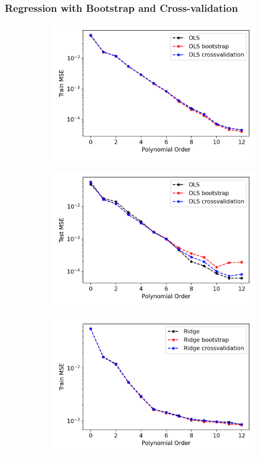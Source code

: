 \subsubsection{Regression with Bootstrap and Cross-validation}
\begin{figure}[ht]
\centering
\begin{subfigure}{.5\textwidth}
  \centering
  \includegraphics[width=.8\linewidth]{Images/ols9.png}
  \caption{}
  \label{fig:ols9}
\end{subfigure}%
\begin{subfigure}{.5\textwidth}
  \centering
  \includegraphics[width=.8\linewidth]{Images/ols8.png}
  \caption{}
  \label{fig:ols8}
\end{subfigure}
\begin{subfigure}{.5\textwidth}
  \centering
  \includegraphics[width=.8\linewidth]{Images/ridge9.png}

\end{subfigure}
\end{figure}
